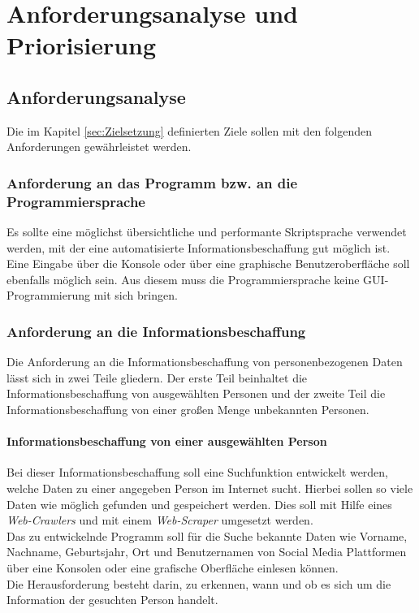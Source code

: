 
\chapter{Anforderungsanalyse und Priorisierung}  %
\label{cha:Anforderungsanalyse und Prioriesierung} %
\section{Anforderungsanalyse} %
\label{sec:Anforderunsanalyse} %
Die im Kapitel \ref{sec:Zielsetzung} definierten Ziele sollen mit den folgenden Anforderungen gewährleistet werden.
	\subsection{Anforderung an das Programm bzw. an die Programmiersprache}
	Es sollte eine möglichst übersichtliche und performante Skriptsprache verwendet werden, mit der eine automatisierte Informationsbeschaffung gut möglich ist. Eine Eingabe über die Konsole oder über eine graphische Benutzeroberfläche soll ebenfalls möglich sein. Aus diesem muss die Programmiersprache keine GUI-Programmierung mit sich bringen.
	\subsection{Anforderung an die Informationsbeschaffung}
	Die Anforderung an die Informationsbeschaffung von personenbezogenen Daten lässt sich in zwei Teile gliedern. Der erste Teil beinhaltet die Informationsbeschaffung von ausgewählten Personen und der zweite Teil die Informationsbeschaffung von einer großen Menge unbekannten Personen.
	
		\subsubsection{Informationsbeschaffung von einer ausgewählten Person}
		Bei dieser Informationsbeschaffung soll eine Suchfunktion entwickelt werden, welche Daten zu einer angegeben Person im Internet sucht. Hierbei sollen so viele Daten wie möglich gefunden und gespeichert werden. Dies soll mit Hilfe eines \textit{Web-Crawlers} und mit einem \textit{Web-Scraper} umgesetzt werden.\\
		Das zu entwickelnde Programm soll für die Suche bekannte Daten wie Vorname, Nachname, Geburtsjahr, Ort und Benutzernamen von Social Media Plattformen über eine Konsolen oder eine grafische Oberfläche einlesen können.\\
		Die Herausforderung besteht darin, zu erkennen, wann und ob es sich um die Information der gesuchten Person handelt.
	

